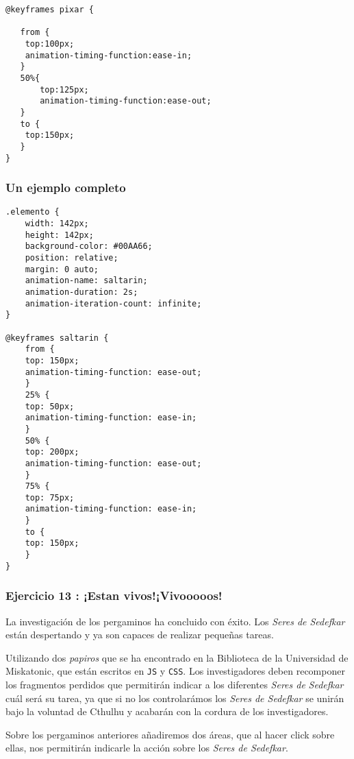 \documentclass[11pt]{article}
\begin{document}
\begin{verbatim}
@keyframes pixar {

   from {
	top:100px;
	animation-timing-function:ease-in;
   }
   50%{
       top:125px;
       animation-timing-function:ease-out;
   }
   to {
	top:150px;
   }
}
\end{verbatim}

\subsubsection{Un ejemplo completo}
\label{sec-1-2-6}

\newpage
\begin{verbatim}
.elemento {
    width: 142px;
    height: 142px;
    background-color: #00AA66;
    position: relative;
    margin: 0 auto;
    animation-name: saltarin;
    animation-duration: 2s;
    animation-iteration-count: infinite;
}

@keyframes saltarin {
    from {
	top: 150px;
	animation-timing-function: ease-out;
    }
    25% {
	top: 50px;
	animation-timing-function: ease-in;
    }
    50% {
	top: 200px;
	animation-timing-function: ease-out;
    }
    75% {
	top: 75px;
	animation-timing-function: ease-in;
    }
    to {
	top: 150px;
    }
}
\end{verbatim}


\subsubsection{Ejercicio 13 : ¡Estan vivos!¡Vivooooos!}
\label{sec-1-2-7}

La investigación de los pergaminos ha concluido con éxito. Los \emph{Seres de
Sedefkar} están despertando y ya son capaces de realizar pequeñas tareas.

Utilizando dos \emph{papiros} que se ha encontrado en la Biblioteca de la Universidad
de Miskatonic, que están escritos en \verb~JS~ y \verb~CSS~. Los investigadores deben
recomponer los fragmentos perdidos que permitirán indicar a los diferentes \emph{Seres de}
\emph{Sedefkar} cuál será su tarea, ya que si no los controlarámos los \emph{Seres de
Sedefkar} se unirán bajo la voluntad de Cthulhu y acabarán con la cordura de los
investigadores.

Sobre los pergaminos anteriores añadiremos dos áreas, que al hacer click sobre
ellas, nos permitirán indicarle la acción sobre los \emph{Seres de Sedefkar}.
\end{document}
